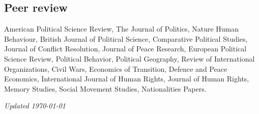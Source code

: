 \documentclass[a4paper, 12pt]{article}
\begin{document}
\subsection*{Peer review}

American Political Science Review, The Journal of Politics, Nature Human Behaviour, British Journal of Political Science, Comparative Political Studies, Journal of Conflict Resolution, Journal of Peace Research, European Political Science Review, Political Behavior, Political Geography, Review of International Organizations, Civil Wars, Economics of Transition, Defence and Peace Economics, International Journal of Human Rights, Journal of Human Rights, Memory Studies, Social Movement Studies, Nationalities Papers.


%

%
%
%

\vfill

\noindent
\flushright
{\small\it Updated \monthdate\today}
\end{document}

